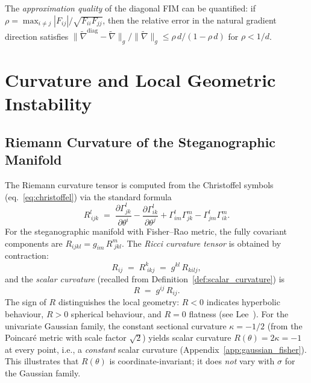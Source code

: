 \documentclass[a4paper,fleqn]{cas-dc}
\newcommand{\natgrad}{\widetilde{\nabla}}
\begin{document}
The \emph{approximation quality} of the diagonal FIM can be quantified:
if $\rho = \max_{i\neq j} |F_{ij}| / \sqrt{F_{ii}F_{jj}}$, then the
relative error in the natural gradient direction satisfies
$\|\natgrad^{\mathrm{diag}} - \natgrad\|_g / \|\natgrad\|_g \leq
\rho\,d / (1 - \rho\,d)$ for $\rho < 1/d$.

\section{Curvature and Local Geometric Instability}
\label{sec:curvature}

\subsection{Riemann Curvature of the Steganographic Manifold}

The Riemann curvature tensor is computed from the
Christoffel symbols (eq.~\eqref{eq:christoffel}) via the standard formula
\begin{equation}
  R^l_{\,ijk} \;=\; \frac{\partial\Gamma^l_{jk}}{\partial\theta^i}
  - \frac{\partial\Gamma^l_{ik}}{\partial\theta^j}
  + \Gamma^l_{im}\Gamma^m_{jk} - \Gamma^l_{jm}\Gamma^m_{ik}.
  \label{eq:riemann_coords}
\end{equation}
For the steganographic manifold with Fisher--Rao metric, the fully
covariant components are $R_{ijkl} = g_{im}\,R^m_{\;jkl}$.
The \emph{Ricci curvature tensor} is obtained by contraction:
\begin{equation}
  R_{ij} \;=\; R^k_{\;ikj} \;=\; g^{kl}\,R_{kilj},
  \label{eq:ricci_tensor}
\end{equation}
and the \emph{scalar curvature} (recalled from
Definition~\ref{def:scalar_curvature}) is
\begin{equation}
  R \;=\; g^{ij}\,R_{ij}.
  \label{eq:scalar_curvature_sec8}
\end{equation}
The sign of $R$ distinguishes the local geometry:
$R<0$ indicates hyperbolic behaviour, $R>0$ spherical behaviour, and
$R=0$ flatness (see Lee~\cite{lee2006riemannian}).
For the univariate Gaussian family, the constant sectional curvature
$\kappa = -1/2$ (from the Poincar\'e metric with scale factor $\sqrt{2}$)
yields scalar curvature $R(\theta) = 2\kappa = -1$ at every point,
i.e., a \emph{constant} scalar curvature
(Appendix~\ref{app:gaussian_fisher}).
This illustrates that $R(\theta)$ is coordinate-invariant; it does
\emph{not} vary with $\sigma$ for the Gaussian family.
\end{document}
